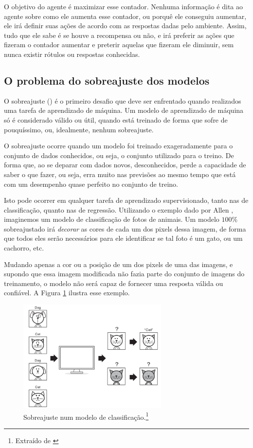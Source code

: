 O objetivo do agente é maximizar esse contador. Nenhuma informação é dita ao agente sobre como ele aumenta esse contador, ou porquê ele conseguiu aumentar, ele irá definir suas ações de acordo com as respostas dadas pelo ambiente. Assim, tudo que ele sabe é se houve a recompensa ou não, e irá preferir as ações que fizeram o contador aumentar e preterir aquelas que fizeram ele diminuir, sem nunca existir rótulos ou respostas conhecidas.

\subsection{O problema do sobreajuste dos modelos}

O sobreajuste () é o primeiro desafio que deve ser enfrentado quando realizados uma tarefa de aprendizado de máquina. Um modelo de aprendizado de máquina só é considerado válido ou útil, quando está treinado de forma que sofre de pouquíssimo, ou, idealmente, nenhum sobreajuste.

O sobreajuste ocorre quando um modelo foi treinado exageradamente para o conjunto de dados conhecidos, ou seja, o conjunto utilizado para o treino. De forma que, ao se deparar com dados novos, desconhecidos, perde a capacidade de saber o que fazer, ou seja, erra muito nas previsões ao mesmo tempo que está com um desempenho quase perfeito no conjunto de treino. 

Isto pode ocorrer em qualquer tarefa de aprendizado supervisionado, tanto nas de classificação, quanto nas de regressão. Utilizando o exemplo dado por Allen \citep{allen}, imaginemos um modelo de classificação de fotos de animais. Um modelo $100\%$ sobreajustado irá \emph{decorar} as cores de cada um dos pixels dessa imagem, de forma que todos eles serão necessários para ele identificar se tal foto é um gato, ou um cachorro, etc.

Mudando apenas a cor ou a posição de um dos pixels de uma das imagens, e supondo que essa imagem modificada não fazia parte do conjunto de imagens do treinamento, o modelo não será capaz de fornecer uma resposta válida ou confiável. A Figura \ref{fig:over_class} ilustra esse exemplo.

\begin{figure}[htb]
\centering
\includegraphics[width=7.5cm]{figuras/over_class}
\caption{Sobreajuste num modelo de classificação.\footnote{Extraído de \citep{allen}}}
\label{fig:over_class}
\end{figure}

